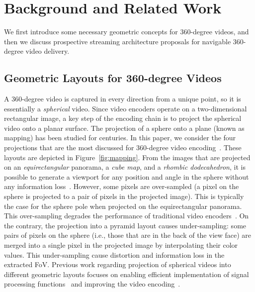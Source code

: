 \section{Background and Related Work}
\label{sec:related}

We first introduce some necessary geometric concepts for 360-degree videos, and then we discuss
prospective streaming architecture proposals for navigable 360-degree video delivery.

\subsection{Geometric Layouts for 360-degree Videos}

A 360-degree video is captured in every direction from a unique
point, so it is essentially a \emph{spherical} video. Since video encoders operate on a
two-dimensional rectangular image, a key step of the encoding chain is to project the spherical
video onto a planar
surface.
The projection of a sphere onto a plane (known as mapping) has been studied
for centuries. In this paper, we consider the four projections that are the most discussed for
360-degree video encoding~\cite{yu_framework_2015}. These layouts are depicted in
Figure~\ref{fig:mapping}.
From
the images that are
projected on an \textit{equirectangular} panorama, a \textit{cube map}, and a
\textit{rhombic dodecahedron}, it is possible
to generate a viewport
for any position and angle in the sphere without any information
loss~\cite{Ng2005, fu_rhombic_2009}. However, some pixels
are over-sampled (a pixel on the sphere is projected to a pair of pixels in the
projected image). This is typically the case for the sphere pole when projected on the equirectangular panorama.
This over-sampling degrades the
performance of traditional video encoders~\cite{wojciechowski_h.264_2006,
yu_framework_2015}.
On the
contrary, the projection into a pyramid layout causes under-sampling: some pairs of pixels
on the sphere (i.e., those that are
in the back of the view face) are merged into a single pixel in
the projected image by interpolating their
color values. This under-sampling cause distortion and information loss in the extracted
FoV.
Previous work regarding projection of spherical videos into different
geometric layouts focuses on enabling efficient implementation of signal processing
functions~\cite{kazhdan_metric-aware_2010} and improving the video
encoding~\cite{tosic_low_2009}.

